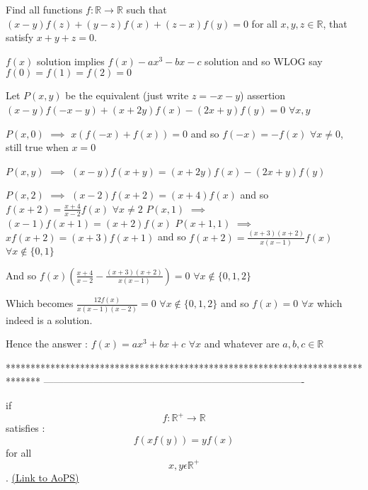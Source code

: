 \begin{solution}
	\begin{tcolorbox}Find all functions $f : \mathbb{R} \to \mathbb{R}$ such that $(x-y)f(z)+(y-z)f(x)+(z-x)f(y) = 0$ for all $x,y,z\in\mathbb{R}$, that satisfy $x+y+z=0.$\end{tcolorbox}
$f(x)$ solution implies $f(x)-ax^3-bx-c$ solution and so WLOG say $f(0)=f(1)=f(2)=0$

Let $P(x,y)$ be the equivalent (just write $z=-x-y$) assertion $(x-y)f(-x-y)+(x+2y)f(x)-(2x+y)f(y)=0$ $\forall x,y$

$P(x,0)$ $\implies$ $x(f(-x)+f(x))=0$ and so $f(-x)=-f(x)$ $\forall x\ne 0$, still true when $x=0$

$P(x,y)$ $\implies$ $(x-y)f(x+y)=(x+2y)f(x)-(2x+y)f(y)$

$P(x,2)$ $\implies$ $(x-2)f(x+2)=(x+4)f(x)$ and so $f(x+2)=\frac{x+4}{x-2}f(x)$ $\forall x\ne 2$
$P(x,1)$ $\implies$ $(x-1)f(x+1)=(x+2)f(x)$
$P(x+1,1)$ $\implies$ $xf(x+2)=(x+3)f(x+1)$ and so $f(x+2)=\frac{(x+3)(x+2)}{x(x-1)}f(x)$ $\forall x\notin\{0,1\}$

And so $f(x)\left(\frac{x+4}{x-2}-\frac{(x+3)(x+2)}{x(x-1)}\right)=0$ $\forall x\notin\{0,1,2\}$

Which becomes $\frac{12f(x)}{x(x-1)(x-2)}=0$ $\forall x\notin\{0,1,2\}$ and so $f(x)=0$ $\forall x$ which indeed is a solution.

Hence the answer : $\boxed{f(x)=ax^3+bx+c}$ $\forall x$ and whatever are $a,b,c\in\mathbb R$
\end{solution}
*******************************************************************************
-------------------------------------------------------------------------------

\begin{problem}
	if \[f:\mathbb{R}^+\rightarrow \mathbb{R}\] satisfies :\[f(xf(y))=yf(x)\]
for all \[x,y\epsilon \mathbb{R}^+\].
	\flushright \href{https://artofproblemsolving.com/community/c6h490565}{(Link to AoPS)}
\end{problem}



